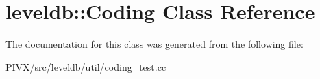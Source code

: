 \hypertarget{classleveldb_1_1_coding}{}\section{leveldb\+:\+:Coding Class Reference}
\label{classleveldb_1_1_coding}


The documentation for this class was generated from the following file\+:\begin{DoxyCompactItemize}
\item 
P\+I\+V\+X/src/leveldb/util/coding\+\_\+test.\+cc\end{DoxyCompactItemize}
